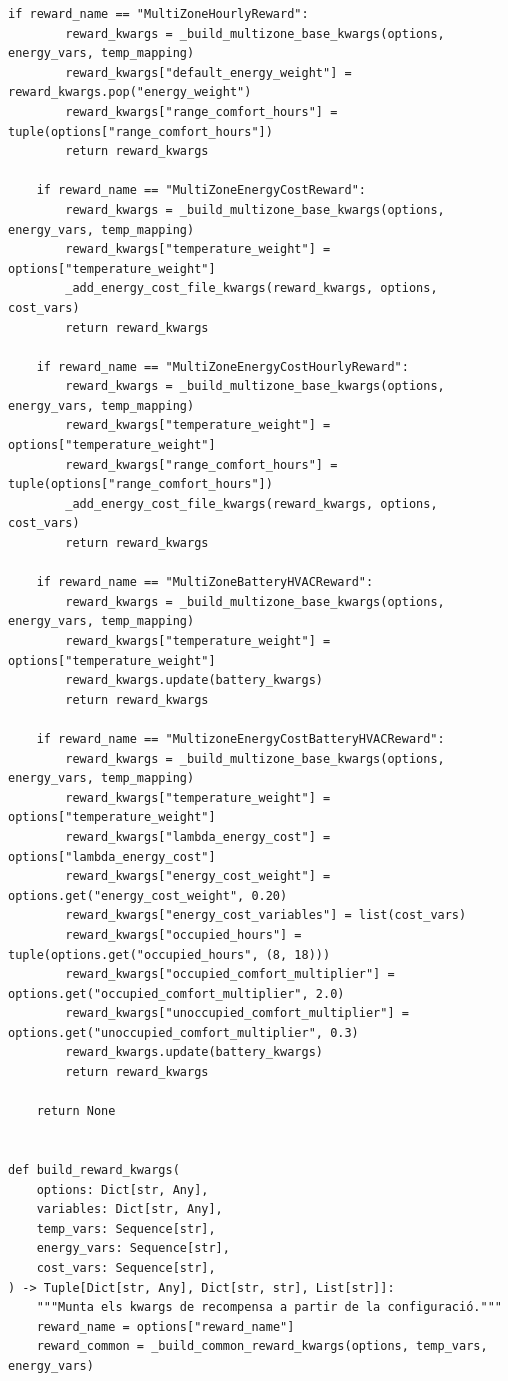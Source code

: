 \documentclass[10pt,a4paper]{article}
\begin{document}
\begin{lstlisting}[style=studioPython,caption={backend/entrenar\_agent\_rewards.py},label={lst:backend-entrenar-agent-rewards-py}]
    if reward_name == "MultiZoneHourlyReward":
        reward_kwargs = _build_multizone_base_kwargs(options, energy_vars, temp_mapping)
        reward_kwargs["default_energy_weight"] = reward_kwargs.pop("energy_weight")
        reward_kwargs["range_comfort_hours"] = tuple(options["range_comfort_hours"])
        return reward_kwargs

    if reward_name == "MultiZoneEnergyCostReward":
        reward_kwargs = _build_multizone_base_kwargs(options, energy_vars, temp_mapping)
        reward_kwargs["temperature_weight"] = options["temperature_weight"]
        _add_energy_cost_file_kwargs(reward_kwargs, options, cost_vars)
        return reward_kwargs

    if reward_name == "MultiZoneEnergyCostHourlyReward":
        reward_kwargs = _build_multizone_base_kwargs(options, energy_vars, temp_mapping)
        reward_kwargs["temperature_weight"] = options["temperature_weight"]
        reward_kwargs["range_comfort_hours"] = tuple(options["range_comfort_hours"])
        _add_energy_cost_file_kwargs(reward_kwargs, options, cost_vars)
        return reward_kwargs

    if reward_name == "MultiZoneBatteryHVACReward":
        reward_kwargs = _build_multizone_base_kwargs(options, energy_vars, temp_mapping)
        reward_kwargs["temperature_weight"] = options["temperature_weight"]
        reward_kwargs.update(battery_kwargs)
        return reward_kwargs

    if reward_name == "MultizoneEnergyCostBatteryHVACReward":
        reward_kwargs = _build_multizone_base_kwargs(options, energy_vars, temp_mapping)
        reward_kwargs["temperature_weight"] = options["temperature_weight"]
        reward_kwargs["lambda_energy_cost"] = options["lambda_energy_cost"]
        reward_kwargs["energy_cost_weight"] = options.get("energy_cost_weight", 0.20)
        reward_kwargs["energy_cost_variables"] = list(cost_vars)
        reward_kwargs["occupied_hours"] = tuple(options.get("occupied_hours", (8, 18)))
        reward_kwargs["occupied_comfort_multiplier"] = options.get("occupied_comfort_multiplier", 2.0)
        reward_kwargs["unoccupied_comfort_multiplier"] = options.get("unoccupied_comfort_multiplier", 0.3)
        reward_kwargs.update(battery_kwargs)
        return reward_kwargs

    return None


def build_reward_kwargs(
    options: Dict[str, Any],
    variables: Dict[str, Any],
    temp_vars: Sequence[str],
    energy_vars: Sequence[str],
    cost_vars: Sequence[str],
) -> Tuple[Dict[str, Any], Dict[str, str], List[str]]:
    """Munta els kwargs de recompensa a partir de la configuració."""
    reward_name = options["reward_name"]
    reward_common = _build_common_reward_kwargs(options, temp_vars, energy_vars)


\end{lstlisting}
\end{document}
